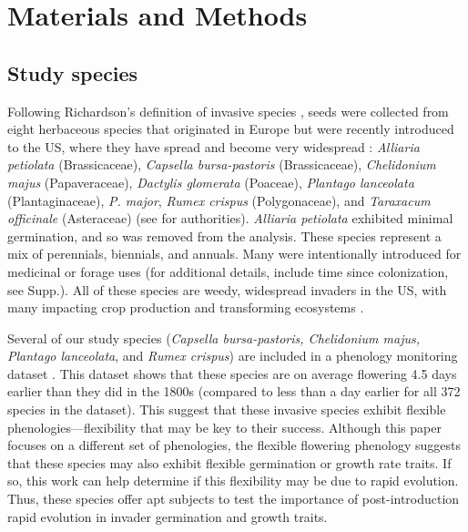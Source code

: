 \documentclass[12pt]{article}\usepackage[]{graphicx}\usepackage[]{color}
\begin{document}
	\section{Materials and Methods}
	\subsection{Study species}
	Following Richardson's definition of invasive species \parencite[][, see Supp. for details]{Richardson2000, Richardson2011}, seeds were collected from eight herbaceous species that originated in Europe but were recently introduced to the US, where they have spread and become very widespread  \parencite{Uva1997}:\textit{ Alliaria petiolata} (Brassicaceae), \textit{Capsella bursa-pastoris} (Brassicaceae), \textit{Chelidonium majus} (Papaveraceae), \textit{Dactylis glomerata} (Poaceae),  \textit{Plantago lanceolata} (Plantaginaceae), \textit{P.  major}, \textit{Rumex crispus} (Polygonaceae), and \textit{Taraxacum officinale} (Asteraceae) (see \textcite{Haines2011} for authorities). \textit{Alliaria petiolata} exhibited minimal germination, and so was removed from the analysis. These species represent a mix of perennials, biennials, and annuals. Many were intentionally introduced for medicinal or forage uses (for additional details, include time since colonization, see Supp.).  All of these species are weedy, widespread invaders in the US, with many impacting crop production and transforming ecosystems \parencite[e.g.,][]{Froese2003,Wolfe2008}. 

Several of our study species (\textit{Capsella bursa-pastoris, Chelidonium majus, Plantago lanceolata}, and \textit{Rumex crispus}) are included in a phenology monitoring dataset \parencite[the Concord Phenology Dataset,][]{Willis:2008bf}. This dataset shows that these species  are on average flowering 4.5 days earlier than they did in the 1800s (compared to less than a day earlier for all 372 species in the dataset). This suggest that these invasive species exhibit flexible phenologies---flexibility that may be key to their success. Although this paper focuses on a different set of phenologies, the flexible flowering phenology suggests that these species may also exhibit flexible germination or growth rate traits. If so, this work can help determine if this flexibility may be due to rapid evolution. Thus, these species offer apt subjects to test the importance of post-introduction rapid evolution in invader germination and growth traits. %
\end{document}
